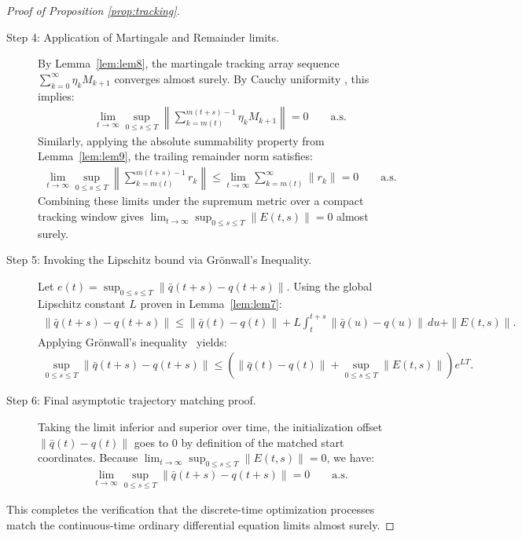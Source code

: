 \documentclass[11pt,a4paper]{article}
\theoremstyle{definition}
\begin{document}
\begin{proof}[Proof of Proposition \ref{prop:tracking}]
\begin{description}
    \item[Step 4: Application of Martingale and Remainder limits.] By Lemma~\ref{lem:lem8}, the martingale tracking array sequence $\sum_{k=0}^{\infty} \eta_k M_{k+1}$ converges almost surely. By Cauchy uniformity \cite{Royden}, this implies:
    \begin{align}
    \lim_{t \to \infty} \sup_{0 \le s \le T} \left\| \sum_{k=m(t)}^{m(t+s)-1} \eta_k M_{k+1} \right\| = 0 \qquad \text{a.s.}
    \end{align}
    Similarly, applying the absolute summability property from Lemma~\ref{lem:lem9}, the trailing remainder norm satisfies:
    \begin{align}
    \lim_{t \to \infty} \sup_{0 \le s \le T} \left\| \sum_{k=m(t)}^{m(t+s)-1} r_k \right\| \le \lim_{t \to \infty} \sum_{k=m(t)}^{\infty} \|r_k\| = 0 \qquad \text{a.s.}
    \end{align}
    Combining these limits under the supremum metric over a compact tracking window gives $\lim_{t \to \infty} \sup_{0 \le s \le T} \|E(t,s)\| = 0$ almost surely.

    \item[Step 5: Invoking the Lipschitz bound via Grönwall's Inequality.] Let $e(t) = \sup_{0 \le s \le T} \|\bar{q}(t+s) - q(t+s)\|$. Using the global Lipschitz constant $L$ proven in Lemma~\ref{lem:lem7}:
    \begin{align}
    \|\bar{q}(t+s) - q(t+s)\| \le \|\bar{q}(t) - q(t)\| + L \int_{t}^{t+s} \|\bar{q}(u) - q(u)\| \, du + \|E(t,s)\|.
    \end{align}
    Applying Grönwall's inequality~\cite{hirsch2013differential} yields:
    \begin{align}
    \sup_{0 \le s \le T} \|\bar{q}(t+s) - q(t+s)\| \le \left( \|\bar{q}(t) - q(t)\| + \sup_{0 \le s \le T} \|E(t,s)\| \right) e^{LT}.
    \end{align}

    \item[Step 6: Final asymptotic trajectory matching proof.] Taking the limit inferior and superior over time, the initialization offset $\|\bar{q}(t) - q(t)\|$ goes to 0 by definition of the matched start coordinates. Because $\lim_{t \to \infty} \sup_{0 \le s \le T} \|E(t,s)\| = 0$, we have:
    \begin{align}
    \lim_{t \to \infty} \sup_{0 \le s \le T} \|\bar{q}(t+s) - q(t+s)\| = 0 \qquad \text{a.s.}
    \end{align}
\end{description}
This completes the verification that the discrete-time optimization processes match the continuous-time ordinary differential equation limits almost surely.
\end{proof}
\end{document}
